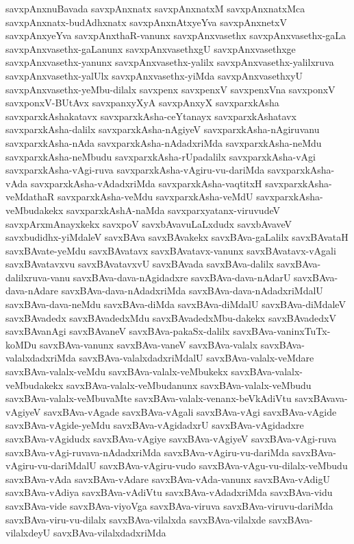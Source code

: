 {savxpAnxnuBavada
savxpAnxnatx
savxpAnxnatxM
savxpAnxnatxMca
savxpAnxnatx-budAdhxnatx
savxpAnxnAtxyeYva
savxpAnxnetxV
savxpAnxyeYva
savxpAnxthaR-vanunx
savxpAnxvasethx
savxpAnxvasethx-gaLa
savxpAnxvasethx-gaLanunx
savxpAnxvasethxgU
savxpAnxvasethxge
savxpAnxvasethx-yanunx
savxpAnxvasethx-yalilx
savxpAnxvasethx-yalilxruva
savxpAnxvasethx-yalUlx
savxpAnxvasethx-yiMda
savxpAnxvasethxyU
savxpAnxvasethx-yeMbu-dilalx
savxpenx
savxpenxV
savxpenxVna
savxponxV
savxponxV-BUtAvx
savxpanxyXyA
savxpAnxyX
savxparxkAsha
savxparxkAshakatavx
savxparxkAsha-ceYtanayx
savxparxkAshatavx
savxparxkAsha-dalilx
savxparxkAsha-nAgiyeV
savxparxkAsha-nAgiruvanu
savxparxkAsha-nAda
savxparxkAsha-nAdadxriMda
savxparxkAsha-neMdu
savxparxkAsha-neMbudu
savxparxkAsha-rUpadalilx
savxparxkAsha-vAgi
savxparxkAsha-vAgi-ruva
savxparxkAsha-vAgiru-vu-dariMda
savxparxkAsha-vAda
savxparxkAsha-vAdadxriMda
savxparxkAsha-vaqtitxH
savxparxkAsha-veMdathaR
savxparxkAsha-veMdu
savxparxkAsha-veMdU
savxparxkAsha-veMbudakekx
savxparxkAshA-naMda
savxparxyatanx-viruvudeV
savxpArxmAnayxkekx
savxpoV
savxbAvavuLaLxdudx
savxbAvaveV
savxbudidhx-yiMdaleV
savxBAva
savxBAvakekx
savxBAva-gaLalilx
savxBAvataH
savxBAvate-yeMdu
savxBAvatavx
savxBAvatavx-vanunx
savxBAvatavx-vAgali
savxBAvatavxvu
savxBAvatavxvU
savxBAvada
savxBAva-dalilx
savxBAva-dalilxruva-vanu
savxBAva-dava-nAgidadxre
savxBAva-dava-nAdarU
savxBAva-dava-nAdare
savxBAva-dava-nAdadxriMda
savxBAva-dava-nAdadxriMdalU
savxBAva-dava-neMdu
savxBAva-diMda
savxBAva-diMdalU
savxBAva-diMdaleV
savxBAvadedx
savxBAvadedxMdu
savxBAvadedxMbu-dakekx
savxBAvadedxV
savxBAvanAgi
savxBAvaneV
savxBAva-pakaSx-dalilx
savxBAva-vaninxTuTx-koMDu
savxBAva-vanunx
savxBAva-vaneV
savxBAva-valalx
savxBAva-valalxdadxriMda
savxBAva-valalxdadxriMdalU
savxBAva-valalx-veMdare
savxBAva-valalx-veMdu
savxBAva-valalx-veMbukekx
savxBAva-valalx-veMbudakekx
savxBAva-valalx-veMbudanunx
savxBAva-valalx-veMbudu
savxBAva-valalx-veMbuvaMte
savxBAva-valalx-venanx-beVkAdiVtu
savxBAvava-vAgiyeV
savxBAva-vAgade
savxBAva-vAgali
savxBAva-vAgi
savxBAva-vAgide
savxBAva-vAgide-yeMdu
savxBAva-vAgidadxrU
savxBAva-vAgidadxre
savxBAva-vAgidudx
savxBAva-vAgiye
savxBAva-vAgiyeV
savxBAva-vAgi-ruva
savxBAva-vAgi-ruvava-nAdadxriMda
savxBAva-vAgiru-vu-dariMda
savxBAva-vAgiru-vu-dariMdalU
savxBAva-vAgiru-vudo
savxBAva-vAgu-vu-dilalx-veMbudu
savxBAva-vAda
savxBAva-vAdare
savxBAva-vAda-vanunx
savxBAva-vAdigU
savxBAva-vAdiya
savxBAva-vAdiVtu
savxBAva-vAdadxriMda
savxBAva-vidu
savxBAva-vide
savxBAva-viyoVga
savxBAva-viruva
savxBAva-viruvu-dariMda
savxBAva-viru-vu-dilalx
savxBAva-vilalxda
savxBAva-vilalxde
savxBAva-vilalxdeyU
savxBAva-vilalxdadxriMda
}
